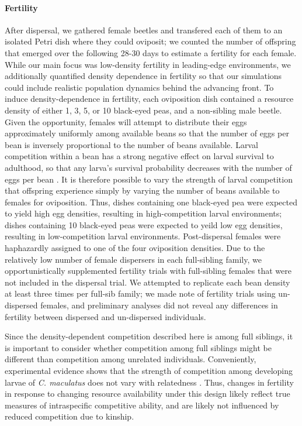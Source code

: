 \documentclass[11pt]{article}
\newcommand{\revise}[1]{{\color{Mahogany}{#1}}}
\begin{document}
\paragraph{Fertility}
After dispersal, we gathered female beetles and transfered each of them to an isolated Petri dish \revise{with one male} where they could \revise{mate and} oviposit; we counted the number of offspring that emerged over the following 28-30 days to estimate a fertility for each female.
While our main focus was low-density fertility in leading-edge environments, we additionally quantified density dependence in fertility so that our simulations could include realistic population dynamics behind the advancing front.
To induce density-dependence in fertility, each oviposition dish contained a resource density of either 1, 3, 5, or 10 black-eyed peas, and a non-sibling male beetle.
Given the opportunity, females will attempt to distribute their eggs approximately uniformly among available beans \citep{fujii_behavioral_1990} so that the number of eggs per bean is inversely proportional to the number of beans available.
Larval competition within a bean has a strong negative effect on larval survival to adulthood, so that any larva's survival probability decreases with the number of eggs per bean \citep{giga_intraspecific_1991}.
It is therefore possible to vary the strength of larval competition that offspring experience simply by varying the number of beans available to females for oviposition.
Thus, dishes containing one black-eyed pea were expected to yield high egg densities, resulting in high-competition larval environments; dishes containing 10 black-eyed peas were expected to yeild low egg densities, resulting in low-competition larval environments.
Post-dispersal females were haphazardly assigned to one of the four oviposition densities.
Due to the relatively low number of female dispersers in each full-sibling family, we opportunistically supplemented fertility trials with full-sibling females that were not included in the dispersal trial.
We attempted to replicate each bean density at least three times per full-sib family; we made note of fertility trials using un-dispersed females, and preliminary analyses did not reveal any differences in fertility between dispersed and un-dispersed individuals.

Since the density-dependent competition described here is among full siblings, it is important to consider whether competition among full siblings might be different than competition among unrelated individuals.
Conveniently, experimental evidence shows that the strength of competition among developing larvae of \textit{C. maculatus} does not vary with relatedness \citep{smallegange_local_2008}.
Thus, changes in fertility in response to changing resource availability under this design likely reflect true measures of intraspecific competitive ability, and are likely not influenced by reduced competition due to kinship.
\end{document}
